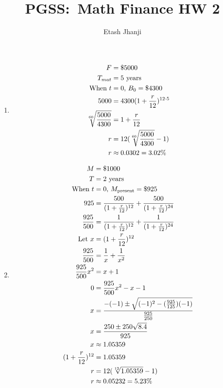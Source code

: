 \documentclass[12pt,letterpaper, twocolumn]{article}
\author{Etash Jhanji}
\title{PGSS:\ Math Finance HW 2}
\date{}
\begin{document}
\maketitle
\begin{enumerate}
    \item \begin{align*}
        F&= \$5000\\
        T_{mat}&= 5 \text{ years}\\
        \text{When }t&=0\text{, }B_0= \$4300\\
        5000 &= 4300{(1+\frac{r}{12})^{12\cdot5}}\\
        \root{60}\of{\frac{5000}{4300}} &= 1+\frac{r}{12}\\
        r&= 12(\root{60}\of{\frac{5000}{4300}}-1)\\
        r&\approx 0.0302 = 3.02\%
    \end{align*}
    \item\begin{align*}
        M&= \$1000\\
        T&= 2 \text{ years}\\
        \text{When }t&=0\text{, }M_{\text{present}}= \$925\\
        925 &= \frac{500}{(1+\frac{r}{12})^{12}} + \frac{500}{(1+\frac{r}{12})^{24}}\\
        \frac{925}{500} &= \frac{1}{(1+\frac{r}{12})^{12}} + \frac{1}{(1+\frac{r}{12})^{24}}\\
        \text{Let }x &= (1+\frac{r}{12})^{12}\\
        \frac{925}{500} &= \frac{1}{x} + \frac{1}{x^2}\\
        \frac{925}{500}x^2 &= x + 1\\
        0&=\frac{925}{500}x^2 - x - 1\\
        x &= \frac{-(-1)\pm \sqrt{(-1)^2-(\frac{925}{125})(-1)}}{\frac{925}{250}}\\
        x &= \frac{250\pm 250\sqrt{8.4}}{925}\\
        x &\approx 1.05359\\
        (1+\frac{r}{12})^{12} &= 1.05359\\
        r & = 12(\root{12}\of{1.05359}-1)\\
        r&\approx0.05232 = 5.23\%
    \end{align*}
\end{enumerate}
\end{document}
